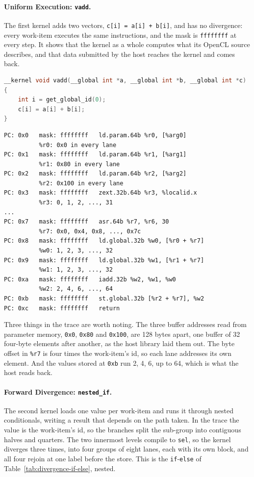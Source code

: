 \paragraph{Uniform Execution: \texttt{vadd}.}
The first kernel adds two vectors, \texttt{c[i] = a[i] + b[i]}, and has
no divergence: every work-item executes the same instructions, and the
mask is \texttt{ffffffff} at every step. It shows that the kernel as a
whole computes what its OpenCL source describes, and that data
submitted by the host reaches the kernel and comes back.

\begin{lstlisting}[language=C, caption={[Source of vadd]OpenCL source
of \texttt{vadd}.}, label={lst:src-vadd}]
__kernel void vadd(__global int *a, __global int *b, __global int *c)
{
    int i = get_global_id(0);
    c[i] = a[i] + b[i];
}
\end{lstlisting}

\begin{lstlisting}[caption={[Trace of vadd]Trace of \texttt{vadd},
abridged.}, label={lst:trace-vadd}]
PC: 0x0   mask: ffffffff   ld.param.64b %r0, [%arg0]
          %r0: 0x0 in every lane
PC: 0x1   mask: ffffffff   ld.param.64b %r1, [%arg1]
          %r1: 0x80 in every lane
PC: 0x2   mask: ffffffff   ld.param.64b %r2, [%arg2]
          %r2: 0x100 in every lane
PC: 0x3   mask: ffffffff   zext.32b.64b %r3, %localid.x
          %r3: 0, 1, 2, ..., 31
...
PC: 0x7   mask: ffffffff   asr.64b %r7, %r6, 30
          %r7: 0x0, 0x4, 0x8, ..., 0x7c
PC: 0x8   mask: ffffffff   ld.global.32b %w0, [%r0 + %r7]
          %w0: 1, 2, 3, ..., 32
PC: 0x9   mask: ffffffff   ld.global.32b %w1, [%r1 + %r7]
          %w1: 1, 2, 3, ..., 32
PC: 0xa   mask: ffffffff   iadd.32b %w2, %w1, %w0
          %w2: 2, 4, 6, ..., 64
PC: 0xb   mask: ffffffff   st.global.32b [%r2 + %r7], %w2
PC: 0xc   mask: ffffffff   return
\end{lstlisting}

Three things in the trace are worth noting. The three buffer addresses
read from parameter memory, \texttt{0x0}, \texttt{0x80} and
\texttt{0x100}, are 128 bytes apart, one buffer of 32 four-byte
elements after another, as the host library laid them out. The byte
offset in \texttt{\%r7} is four times the work-item's id, so each lane
addresses its own element. And the values stored at \texttt{0xb} run
2, 4, 6, up to 64, which is what the host reads back.

\paragraph{Forward Divergence: \texttt{nested\_if}.}
The second kernel loads one value per work-item and runs it through
nested conditionals, writing a result that depends on the path taken.
In the trace the value is the work-item's id, so the branches split the
sub-group into contiguous halves and quarters. The two innermost
levels compile to \texttt{sel}, so the kernel diverges three
times, into four groups of eight lanes, each with its own block, and
all four rejoin at one label before the store. This is the
\texttt{if}-\texttt{else} of Table~\ref{tab:divergence-if-else},
nested.

